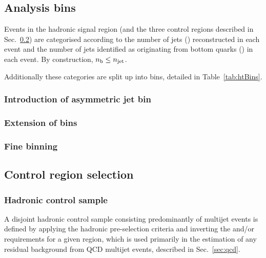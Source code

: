 \subsection{Analysis bins}

Events in the hadronic signal region (and the
three control regions described in Sec.~\ref{sec:controlSelection}) are
categorised according to the number of jets (\njet) reconstructed in
each event and the number of jets identified as originating from
bottom quarks (\nb) in each event. By construction, $n_{\text{b}} \leq n_{\text{jet}}$.

Additionally these categories are split up into \HT bins, detailed in 
Table~\ref{tab:htBins}.


\subsubsection{Introduction of asymmetric jet bin}


\subsubsection{Extension of \HT bins}

\subsubsection{Fine \njet binning}

\subsection{Control region selection}
\label{sec:controlSelection}

\subsubsection{Hadronic control sample}

A disjoint hadronic control sample consisting predominantly of
multijet events is defined by applying the hadronic pre-selection
criteria and inverting the \alphat and/or \mhtmet requirements for a
given \scalht region, which is used primarily in the estimation of any
residual background from QCD multijet events, described in
Sec.~\ref{sec:qcd}.

